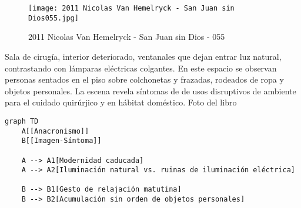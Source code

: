 \clearpage
\begin{figure}[h!]
    \centering
    \texttt{[image: 2011 Nicolas Van Hemelryck - San Juan sin Dios055.jpg]}
    \caption{2011 Nicolas Van Hemelryck - San Juan sin Dios - 055}
    \label{fig:2011NicolasVanHemelryckSanJuansinDios-055}
\end{figure}

Sala de cirugía, interior deteriorado, ventanales que dejan entrar luz natural, contrastando con lámparas eléctricas colgantes. En este espacio se observan personas sentados en el piso sobre colchonetas y frazadas, rodeados de ropa y objetos personales. La escena revela síntomas de de usos disruptivos de ambiente para el cuidado quirúrjico y en hábitat doméstico. Foto del libro \parencite{Hemelryck2011}

\small
\begin{verbatim}
graph TD
    A[[Anacronismo]]
    B[[Imagen-Síntoma]]
    
    A --> A1[Modernidad caducada]
    A --> A2[Iluminación natural vs. ruinas de iluminación eléctrica]
    
    B --> B1[Gesto de relajación matutina]
    B --> B2[Acumulación sin orden de objetos personales]

\end{verbatim}
\normalsize